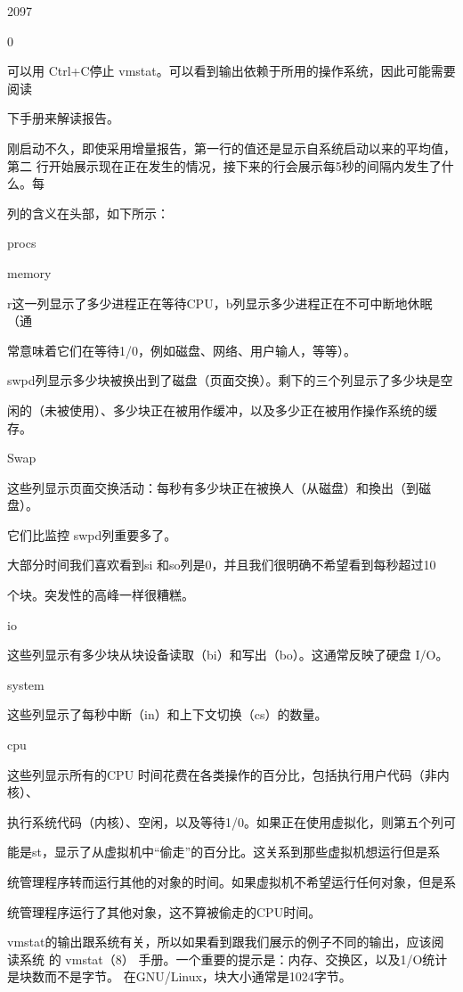 2097

0

可以用 Ctrl+C停止 vmstat。可以看到输出依赖于所用的操作系统，因此可能需要阅读

下手册来解读报告。

刚启动不久，即使采用增量报告，第一行的值还是显示自系统启动以来的平均值，第二
行开始展示现在正在发生的情况，接下来的行会展示每5秒的间隔内发生了什么。每

列的含义在头部，如下所示：

procs

memory

r这一列显示了多少进程正在等待CPU，b列显示多少进程正在不可中断地休眠（通

常意味着它们在等待1/0，例如磁盘、网络、用户输人，等等）。

swpd列显示多少块被换出到了磁盘（页面交换）。剩下的三个列显示了多少块是空

闲的（未被使用）、多少块正在被用作缓冲，以及多少正在被用作操作系统的缓存。

Swap

这些列显示页面交换活动：每秒有多少块正在被换人（从磁盘）和換出（到磁盘）。

它们比监控 swpd列重要多了。

大部分时间我们喜欢看到si 和so列是0，并且我们很明确不希望看到每秒超过10

个块。突发性的高峰一样很糟糕。

io

这些列显示有多少块从块设备读取（bi）和写出（bo）。这通常反映了硬盘 I/O。

system

这些列显示了每秒中断（in）和上下文切换（cs）的数量。

cpu

这些列显示所有的CPU 时间花费在各类操作的百分比，包括执行用户代码（非内核）、

执行系统代码（内核）、空闲，以及等待1/0。如果正在使用虚拟化，则第五个列可

能是st，显示了从虚拟机中“偷走”的百分比。这关系到那些虚拟机想运行但是系

统管理程序转而运行其他的对象的时间。如果虚拟机不希望运行任何对象，但是系

统管理程序运行了其他对象，这不算被偷走的CPU时间。

vmstat的输出跟系统有关，所以如果看到跟我们展示的例子不同的输出，应该阅读系统
的 vmstat（8） 手册。一个重要的提示是：内存、交换区，以及1/O统计是块数而不是字节。
在GNU/Linux，块大小通常是1024字节。

